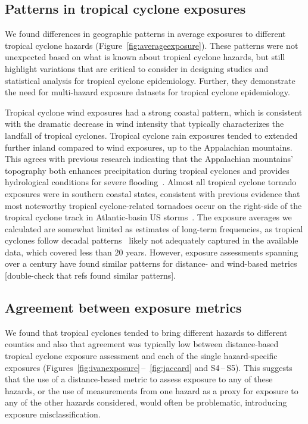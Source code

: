 \subsection*{Patterns in tropical cyclone exposures}

We found differences in geographic patterns in average exposures to different
tropical cyclone hazards (Figure~\ref{fig:averageexposure}). These patterns
were not unexpected based on what is known about tropical cyclone hazards, but
still highlight variations that are critical to consider in designing studies
and statistical analysis for tropical cyclone epidemiology. Further, they
demonstrate the need for multi-hazard exposure datasets for tropical cyclone
epidemiology. 

Tropical cyclone wind exposures had a strong coastal pattern, which is
consistent with the dramatic decrease in wind intensity that typically
characterizes the landfall of tropical cyclones.  Tropical cyclone rain
exposures tended to extended further inland compared to wind exposures, up to
the Appalachian mountains. This agrees with previous research indicating that
the Appalachian mountains' topography both enhances precipitation during
tropical cyclones and provides hydrological conditions for severe
flooding~\parencite{rees2001}.  Almost all tropical cyclone tornado exposures
were in southern coastal states, consistent with previous evidence that most noteworthy
tropical cyclone-related tornadoes occur on the right-side of the tropical
cyclone track in Atlantic-basin \ac{US} storms~\parencite{moore2012}.  The
exposure averages we calculated are somewhat limited as estimates of long-term
frequencies, as tropical cyclones follow decadal
patterns~\parencite{kossin2007more} likely not adequately captured in the
available data, which covered less than 20 years. However, exposure assessments
spanning over a century have found similar patterns for distance- and
wind-based metrics~\textcite{zandbergen2009, kruk2010} [double-check that refs
found similar patterns].

\subsection*{Agreement between exposure metrics}

We found that tropical cyclones tended to bring different hazards to 
different counties and also that agreement was typically low between
distance-based tropical cyclone exposure assessment and each of the single
hazard-specific exposures (Figures~\ref{fig:ivanexposure}\,--\,
\ref{fig:jaccard} and S4\,--\,S5). This suggests that the use of a
distance-based metric to assess exposure to any of these hazards, or the use of
measurements from one hazard as a proxy for exposure to any of the other
hazards considered, would often be problematic, introducing exposure
misclassification. 

